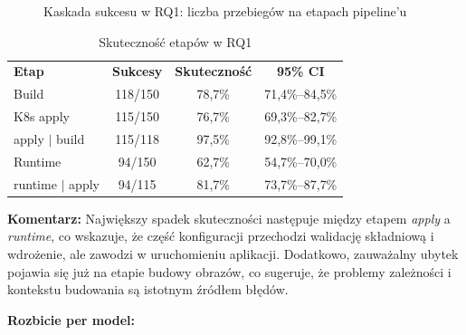 \begin{figure}[h]
    \centering
    \caption{Kaskada sukcesu w RQ1: liczba przebiegów na etapach pipeline'u}
    \label{fig:h1-funnel}
\end{figure}

\begin{table}[h]
    \centering
    \begin{tabular}{lccc}
        \textbf{Etap} & \textbf{Sukcesy} & \textbf{Skuteczność} & \textbf{95\% CI} \\
        Build & 118/150 & 78{,}7\% & 71{,}4\%--84{,}5\% \\
        K8s apply & 115/150 & 76{,}7\% & 69{,}3\%--82{,}7\% \\
        apply $|$ build & 115/118 & 97{,}5\% & 92{,}8\%--99{,}1\% \\
        Runtime & 94/150 & 62{,}7\% & 54{,}7\%--70{,}0\% \\
        runtime $|$ apply & 94/115 & 81{,}7\% & 73{,}7\%--87{,}7\% \\
    \end{tabular}
    \caption{Skuteczność etapów w RQ1}
    \label{tab:h1-stages}
\end{table}

\textbf{Komentarz:} Największy spadek skuteczności następuje między etapem \textit{apply} a \textit{runtime}, co wskazuje, że część konfiguracji przechodzi walidację składniową i wdrożenie, ale zawodzi w uruchomieniu aplikacji. Dodatkowo, zauważalny ubytek pojawia się już na etapie budowy obrazów, co sugeruje, że problemy zależności i kontekstu budowania są istotnym źródłem błędów.

\textbf{Rozbicie per model:}


